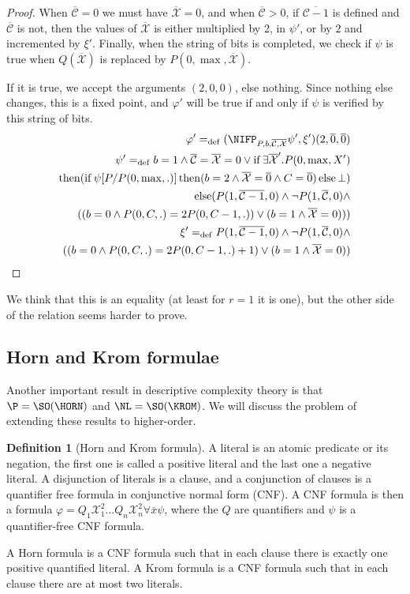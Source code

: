 \documentclass[a4paper,12pt]{article}
\theoremstyle{definition}
\newtheorem{definition}[theorem]{Definition}
\renewcommand{\phi}{\varphi}
\DeclareMathOperator{\ifte}{if}
\DeclareMathOperator{\thent}{then}
\DeclareMathOperator{\elset}{else}
\newcommand{\mc}{\mathcal}
\newcommand{\ol}{\overline}
\newcommand{\olmc}[1]{\overline{\mathcal{#1}}}
\newcommand{\ed}{=_{\mathrm{def}}}
\begin{document}
\begin{proof}
When $\olmc C=0$ we must have $\olmc X=0$, and when $\olmc C>0$, if
$\ol{\mc C-1}$ is defined and $\olmc C$ is not, then the values of
$\olmc X$ is either multiplied by 2, in $\psi'$, or by $2$ and
incremented by $\xi'$. Finally, when the string of bits is completed,
we check if $\psi$ is true when $Q(\olmc X)$ is replaced by
$P(0,\max,\olmc X)$.

If it is true, we accept the arguments $(2,0,0)$, else nothing. Since
nothing else changes, this is a fixed point, and $\phi'$ will be true
if and only if $\psi$ is verified by this string of bits.
\begin{eqnarray}
  \phi'\ed(\NIFP_{P,b,\olmc {C,X}}\psi',\xi')(2,\ol 0,\ol 0)\\
  \psi'\ed b=1\land \olmc C=\olmc X=0\lor \ifte \exists \olmc X'. P(0,\max,X')\nonumber\\
  \thent (\ifte \psi[P/P(0,\max,.)] \thent (b=2\land \olmc X=\ol0\land C=\ol0)\elset\bot)\nonumber\\
  \elset(P(1,\ol{\mc C-1},0)\land\neg P(1,\ol{\mc C},0)\land\nonumber\\
  ((b=0\land P(0,C,.)=2P(0,C-1,.))\lor(b=1\land \olmc X=0)))\\\xi'\ed P(1,\ol{\mc C-1},0)\land\neg P(1,\ol{\mc C},0)\land\nonumber\\
  ((b=0\land P(0,C,.)=2P(0,C-1,.)+1)\lor(b=1\land \olmc X=0))\end{eqnarray}
\end{proof}


We think that this is an equality (at least for $r=1$ it is one), but the
other side of the relation seems harder to prove.
\subsection{Horn and Krom formulae }\label{horn}
Another important result in descriptive complexity theory is that
$\P=\SO(\HORN)$ and $\NL=\SO(\KROM)$. We will discuss the problem of
extending these results to higher-order.

\begin{definition}[Horn and Krom formula]A literal is an atomic predicate
  or its negation, the first one is called a positive literal and the last
  one a negative literal. A disjunction of literals is a clause, and a
  conjunction of clauses is a quantifier free formula in conjunctive
  normal form (CNF). A CNF formula is then a formula $\phi=Q_1\mc
  X_1^{2}\dots Q_n\mc X^{2}_n\forall \ol x\psi$, where the $Q$ are
  quantifiers and $\psi$ is a quantifier-free CNF formula.

  A Horn formula is a CNF formula such that in each clause there is
  exactly one positive quantified literal. A Krom formula is a CNF
  formula such that in each clause there are at most two literals.
\end{definition}
\end{document}
